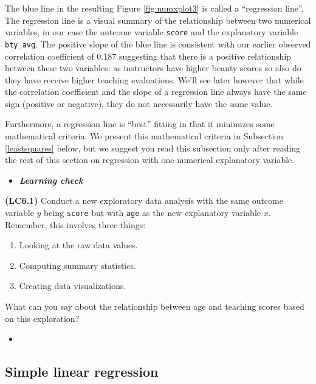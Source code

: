 \documentclass[12pt, krantz2,]{krantz}
\providecommand{\tightlist}{%
  \setlength{\itemsep}{0pt}\setlength{\parskip}{0pt}}
\newenvironment{rmdblock}[1]
  {\begin{shaded*}
  \begin{itemize}
  \renewcommand{\labelitemi}{
    \raisebox{-.7\height}[0pt][0pt]{
    }
  }
  \item
  }
  {
  \end{itemize}
  \end{shaded*}
  }
\newenvironment{learncheck}
  {\begin{rmdblock}{warning}}
  {\end{rmdblock}}
\begin{document}
The blue line in the resulting Figure \ref{fig:numxplot3} is called a ``regression line''. The regression line is a visual summary of the relationship between two numerical variables, in our case the outcome variable \texttt{score} and the explanatory variable \texttt{bty\_avg}. The positive slope of the blue line is consistent with our earlier observed correlation coefficient of 0.187 suggesting that there is a positive relationship between these two variables: as instructors have higher beauty scores so also do they have receive higher teaching evaluations. We'll see later however that while the correlation coefficient and the slope of a regression line always have the same sign (positive or negative), they do not necessarily have the same value.

Furthermore, a regression line is ``best'' fitting in that it minimizes some mathematical criteria. We present this mathematical criteria in Subsection \ref{leastsquares} below, but we suggest you read this subsection only after reading the rest of this section on regression with one numerical explanatory variable.

\begin{learncheck}
\textbf{\emph{Learning check}}
\end{learncheck}

\textbf{(LC6.1)} Conduct a new exploratory data analysis with the same outcome variable \(y\) being \texttt{score} but with \texttt{age} as the new explanatory variable \(x\). Remember, this involves three things:

\begin{enumerate}
\def\labelenumi{\alph{enumi})}
\tightlist
\item
  Looking at the raw data values.
\item
  Computing summary statistics.
\item
  Creating data visualizations.
\end{enumerate}

What can you say about the relationship between age and teaching scores based on this exploration?

\begin{learncheck}

\end{learncheck}

\hypertarget{model1table}{%
\subsection{Simple linear regression}\label{model1table}}
\end{document}
